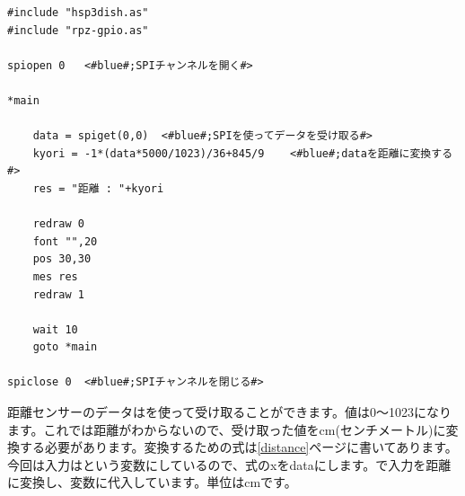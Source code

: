 \begin{lstlisting}[caption=kyori.hsp,label=kyori.hsp]
#include "hsp3dish.as"
#include "rpz-gpio.as"

spiopen 0	<#blue#;SPIチャンネルを開く#>

*main

	data = spiget(0,0)	<#blue#;SPIを使ってデータを受け取る#>
	kyori = -1*(data*5000/1023)/36+845/9	<#blue#;dataを距離に変換する#>
	res = "距離 : "+kyori
	
	redraw 0
	font "",20
	pos 30,30
	mes res
	redraw 1

	wait 10
	goto *main

spiclose 0	<#blue#;SPIチャンネルを閉じる#>
\end{lstlisting}

距離センサーのデータはを使って受け取ることができます。値は0～1023になります。これでは距離がわからないので、受け取った値をcm(センチメートル)に変換する必要があります。変換するための式は\ref{distance}ページに書いてあります。今回は入力はという変数にしているので、式のxをdataにします。で入力を距離に変換し、変数に代入しています。単位はcmです。\\

\begin{tcolorbox}[title=\useOmetoi]
\begin{enumerate}
\end{enumerate}
\end{tcolorbox}
